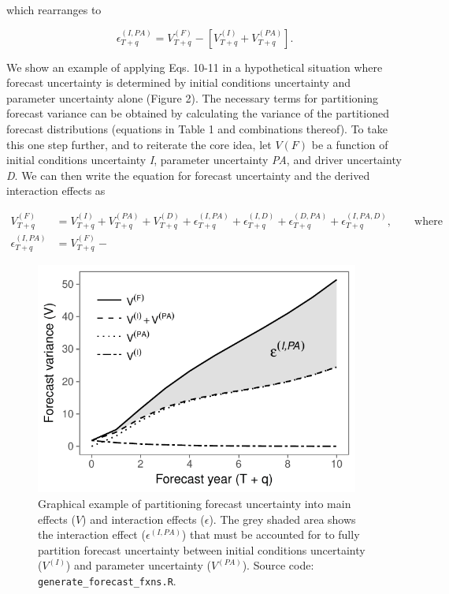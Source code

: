 \documentclass[12pt,]{article}
\begin{document}
\noindent{}which rearranges to

\begin{equation}
\epsilon_{T+q}^{(I,PA)} = V^{(F)}_{T+q} - \left[ V^{(I)}_{T+q} + V^{(PA)}_{T+q} \right].
\end{equation}

\noindent{}We show an example of applying Eqs. 10-11 in a hypothetical
situation where forecast uncertainty is determined by initial conditions
uncertainty and parameter uncertainty alone (Figure 2). The necessary
terms for partitioning forecast variance can be obtained by calculating
the variance of the partitioned forecast distributions (equations in
Table 1 and combinations thereof). To take this one step further, and to
reiterate the core idea, let \(V(F)\) be a function of initial
conditions uncertainty \emph{I}, parameter uncertainty \emph{PA}, and
driver uncertainty \emph{D}. We can then write the equation for forecast
uncertainty and the derived interaction effects as

\begin{align}
V^{(F)}_{T+q} &= V^{(I)}_{T+q} + V^{(PA)}_{T+q} + V^{(D)}_{T+q} + \epsilon^{(I,PA)}_{T+q} + \epsilon^{(I,D)}_{T+q} + \epsilon^{(D,PA)}_{T+q} + \epsilon^{(I,PA,D)}_{T+q}, \qquad \text{where} \\
\epsilon^{(I,PA)}_{T+q} &= V^{(F)}_{T+q} - 
\end{align}

\begin{figure}
\centering
\includegraphics[width=\textwidth,height=3in]{../figures/example_interaction_effect.pdf}
\caption{Graphical example of partitioning forecast uncertainty into
main effects (\(V\)) and interaction effects (\(\epsilon\)). The grey
shaded area shows the interaction effect (\(\epsilon^{(I,PA)}\)) that
must be accounted for to fully partition forecast uncertainty between
initial conditions uncertainty (\(V^{(I)}\)) and parameter uncertainty
(\(V^{(PA)}\)). Source code: \texttt{generate\_forecast\_fxns.R}.}
\end{figure}
\end{document}
